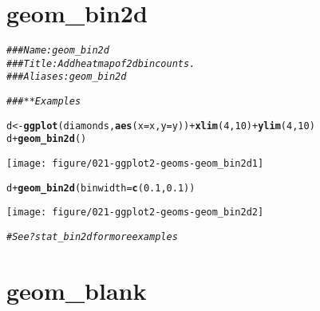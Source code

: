 \documentclass[a4paper,titlepage]{tufte-handout}\usepackage[]{graphicx}\usepackage[]{color}
\makeatletter
\def\maxwidth{ %
  \ifdim\Gin@nat@width>\linewidth
    \linewidth
  \else
    \Gin@nat@width
  \fi
}
\newcommand{\hlnum}[1]{\textcolor[rgb]{0.686,0.059,0.569}{#1}}%
\newcommand{\hlcom}[1]{\textcolor[rgb]{0.678,0.584,0.686}{\textit{#1}}}%
\newcommand{\hlopt}[1]{\textcolor[rgb]{0,0,0}{#1}}%
\newcommand{\hlstd}[1]{\textcolor[rgb]{0.345,0.345,0.345}{#1}}%
\newcommand{\hlkwb}[1]{\textcolor[rgb]{0.69,0.353,0.396}{#1}}%
\newcommand{\hlkwc}[1]{\textcolor[rgb]{0.333,0.667,0.333}{#1}}%
\newcommand{\hlkwd}[1]{\textcolor[rgb]{0.737,0.353,0.396}{\textbf{#1}}}%
\newenvironment{kframe}{%
 \def\at@end@of@kframe{}%
 \ifinner\ifhmode%
  \def\at@end@of@kframe{\end{minipage}}%
  \begin{minipage}{\columnwidth}%
 \fi\fi%
 \def\FrameCommand##1{\hskip\@totalleftmargin \hskip-\fboxsep
 \colorbox{shadecolor}{##1}\hskip-\fboxsep
     \hskip-\linewidth \hskip-\@totalleftmargin \hskip\columnwidth}%
 \MakeFramed {\advance\hsize-\width
   \@totalleftmargin\z@ \linewidth\hsize
   \@setminipage}}%
 {\par\unskip\endMakeFramed%
 \at@end@of@kframe}
\newenvironment{knitrout}{}{} %
\makeatother
\begin{document}
\section{geom\_bin2d}

\begin{knitrout}
\color{fgcolor}\begin{kframe}
\begin{alltt}
\hlcom{### Name: geom_bin2d}
\hlcom{### Title: Add heatmap of 2d bin counts.}
\hlcom{### Aliases: geom_bin2d}

\hlcom{### ** Examples}

\hlstd{d} \hlkwb{<-} \hlkwd{ggplot}\hlstd{(diamonds,} \hlkwd{aes}\hlstd{(}\hlkwc{x} \hlstd{= x,} \hlkwc{y} \hlstd{= y))} \hlopt{+} \hlkwd{xlim}\hlstd{(}\hlnum{4}\hlstd{,}\hlnum{10}\hlstd{)} \hlopt{+} \hlkwd{ylim}\hlstd{(}\hlnum{4}\hlstd{,}\hlnum{10}\hlstd{)}
\hlstd{d} \hlopt{+} \hlkwd{geom_bin2d}\hlstd{()}
\end{alltt}
\end{kframe}
\texttt{[image: figure/021-ggplot2-geoms-geom\_bin2d1]} 
\begin{kframe}\begin{alltt}
\hlstd{d} \hlopt{+} \hlkwd{geom_bin2d}\hlstd{(}\hlkwc{binwidth} \hlstd{=} \hlkwd{c}\hlstd{(}\hlnum{0.1}\hlstd{,} \hlnum{0.1}\hlstd{))}
\end{alltt}
\end{kframe}
\texttt{[image: figure/021-ggplot2-geoms-geom\_bin2d2]} 
\begin{kframe}\begin{alltt}
\hlcom{# See ?stat_bin2d for more examples}
\end{alltt}
\end{kframe}
\end{knitrout}


\section{geom\_blank}
\end{document}
